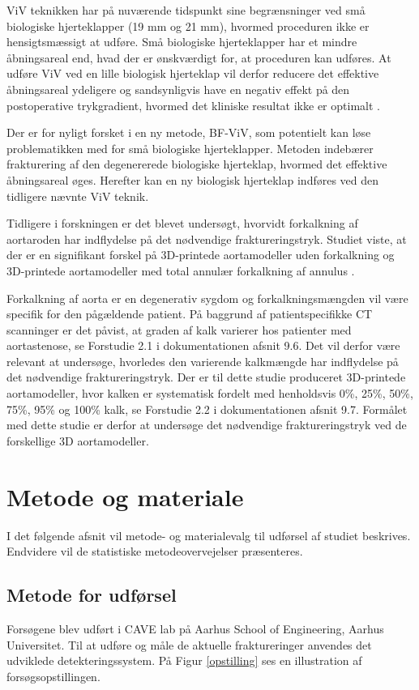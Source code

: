 ViV teknikken har på nuværende tidspunkt sine begrænsninger ved små biologiske hjerteklapper (19 mm og 21 mm), hvormed proceduren ikke er hensigtsmæssigt at udføre. Små biologiske hjerteklapper har et mindre åbningsareal end, hvad der er ønskværdigt for, at proceduren kan udføres. At udføre ViV ved en lille biologisk hjerteklap vil derfor reducere det effektive åbningsareal ydeligere og sandsynligvis have en negativ effekt på den postoperative trykgradient, hvormed det kliniske resultat ikke er optimalt \cite{baggrund22}\cite{baggrund10}. 

Der er for nyligt forsket i en ny metode, BF-ViV, som potentielt kan løse problematikken med for små biologiske hjerteklapper. Metoden indebærer frakturering af den degenererede biologiske hjerteklap, hvormed det effektive åbningsareal øges. Herefter kan en ny biologisk hjerteklap indføres ved den tidligere nævnte ViV teknik.  

Tidligere i forskningen er det blevet undersøgt, hvorvidt forkalkning af aortaroden har indflydelse på det nødvendige fraktureringstryk. Studiet viste, at der er en signifikant forskel på 3D-printede aortamodeller uden forkalkning og 3D-printede aortamodeller med total annulær forkalkning af annulus \cite{rapport}. 

Forkalkning af aorta er en degenerativ sygdom og forkalkningsmængden vil være specifik for den pågældende patient. På baggrund af patientspecifikke CT scanninger er det påvist, at graden af kalk varierer hos patienter med aortastenose, se Forstudie 2.1 i dokumentationen afsnit 9.6. Det vil derfor være relevant at undersøge, hvorledes den varierende kalkmængde har indflydelse på det nødvendige fraktureringstryk. Der er til dette studie produceret 3D-printede aortamodeller, hvor kalken er systematisk fordelt med henholdsvis 0\%, 25\%, 50\%, 75\%, 95\% og 100\% kalk, se Forstudie 2.2 i dokumentationen afsnit 9.7. Formålet med dette studie er derfor at undersøge det nødvendige fraktureringstryk ved de forskellige 3D aortamodeller.        

\section{Metode og materiale} 
I det følgende afsnit vil metode- og materialevalg til udførsel af studiet beskrives. Endvidere vil de statistiske metodeovervejelser præsenteres. 
 
\subsection*{Metode for udførsel} 
Forsøgene blev udført i CAVE lab på Aarhus School of Engineering, Aarhus Universitet. Til at udføre og måle de aktuelle fraktureringer anvendes det udviklede detekteringssystem. På Figur \ref{opstilling} ses en illustration af forsøgsopstillingen. 

